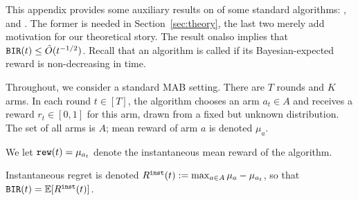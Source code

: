 

\newcommand{\ExplorExploit}{\term{ExplorExploit}}
\newcommand{\PhasedExplorExploit}{\term{PhasedExplorExploit}}
\newcommand{\SuccesiveEliminationReset}{\term{SuccesiveEliminationReset}}

\newcommand{\IReg}{R^{\term{inst}}} %




This appendix provides some auxiliary results on \bmonotonicity of some standard algorithms: \DynGreedy, \DynamicEpsGreedy and \Thompson. The former is needed in Section~\ref{sec:theory}, the last two merely add motivation for our theoretical story. The result on\Thompson also implies that $\mathtt{BIR}(t)\leq \tilde{O}(t^{-1/2})$. Recall that an algorithm is called \bmonotone if its Bayesian-expected reward is non-decreasing in time.

Throughout, we consider a standard MAB setting. There are $T$ rounds and $K$ arms. In each round $t\in [T]$, the algorithm chooses an arm $a_t\in A$ and receives a reward $r_t\in[0,1]$ for this arm, drawn from a fixed but unknown distribution. The set of all arms is $A$; mean reward of arm $a$ is denoted $\mu_a$.

We let
    $\mathtt{rew}(t) = \mu_{a_t}$
denote the instantaneous mean reward of the algorithm.

Instantaneous regret is denoted
    $\IReg(t) := \max_{a\in A} \mu_a - \mu_{a_t}$,
so that
    $\BIR(t) = \E[\IReg(t)]$.


